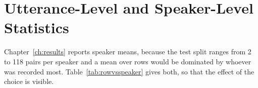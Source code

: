 \begin{table}[htbp]
\caption{Fitted ridge coefficients on standardised source features. The regularisation strength
$\lambda$ was selected on the development split by the one-standard-error rule. For F0 level the
selected $\lambda$ drives every weight to approximately zero, so the model reduces to the
copy-plus-offset baseline.}
\label{tab:coefficients}
\centering
{\singlespacing\footnotesize\setlength{\tabcolsep}{4pt}
\par}
\end{table}

\chapter{Utterance-Level and Speaker-Level Statistics}
\label{app:speakerlevel}

Chapter~\ref{ch:results} reports speaker means, because the test split ranges from 2 to 118 pairs
per speaker and a mean over rows would be dominated by whoever was recorded most.
Table~\ref{tab:rowvsspeaker} gives both, so that the effect of the choice is visible.

